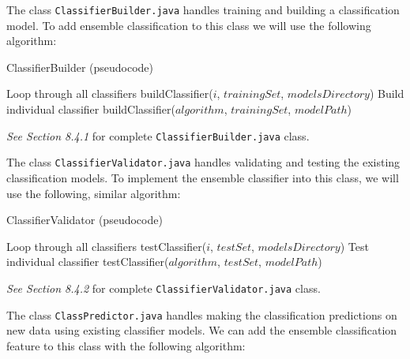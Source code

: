 \documentclass{article}
\begin{document}
The class \verb|ClassifierBuilder.java| handles training and building a classification model. To add ensemble classification to this class we will use the following algorithm:

\begin{algorithm}[H]
    \caption{ClassifierBuilder (pseudocode)}
    \begin{algorithmic}[1]
                \Comment Loop through all classifiers
                \State buildClassifier($i$, $trainingSet$, $modelsDirectory$)
            \EndFor
        \Else 
            \Comment Build individual classifier
            \State buildClassifier($algorithm$, $trainingSet$, $modelPath$)
            
        \EndIf
        
    \end{algorithmic}
\end{algorithm}

\emph{See Section 8.4.1} for complete \verb|ClassifierBuilder.java| class. 

The class \verb|ClassifierValidator.java| handles validating and testing the existing classification models. To implement the ensemble classifier into this class, we will use the following, similar algorithm:

\begin{algorithm}[H]
    \caption{ClassifierValidator (pseudocode)}
    \begin{algorithmic}[1]
                \Comment Loop through all classifiers
                \State testClassifier($i$, $testSet$, $modelsDirectory$)
            \EndFor
        \Else 
            \Comment Test individual classifier
            \State testClassifier($algorithm$, $testSet$, $modelPath$)
        \EndIf
        
    \end{algorithmic}
\end{algorithm}

\emph{See Section 8.4.2} for complete \verb|ClassifierValidator.java| class. 

The class \verb|ClassPredictor.java| handles making the classification predictions on new data using existing classifier models. We can add the ensemble classification feature to this class with the following algorithm:
\end{document}
